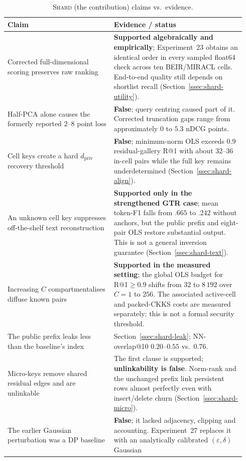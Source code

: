 \documentclass[11pt,a4paper]{article}
\begin{document}
\begin{table}[tbp]
\centering
\caption{\textsc{Shard} (the contribution) claims vs.\ evidence.}
\label{tab:shard-claims}
\footnotesize
\begin{tabular}{@{}p{0.42\linewidth}p{0.52\linewidth}@{}}
\toprule
\textbf{Claim} & \textbf{Evidence / status} \\ \midrule
Corrected full-dimensional scoring preserves raw ranking &
\textbf{Supported algebraically and empirically}; Experiment~23 obtains an
identical order in every sampled float64 check across ten BEIR/MIRACL cells.
End-to-end quality still depends on shortlist recall
(Section~\ref{ssec:shard-utility}). \\
Half-PCA alone causes the formerly reported $2$--$8$ point loss &
\textbf{False}; query centring caused part of it. Corrected truncation gaps
range from approximately $0$ to $5.3$ nDCG points. \\
Cell keys create a hard $d_{\mathrm{priv}}$ recovery threshold &
\textbf{False}; minimum-norm OLS exceeds $0.9$ residual-gallery R@1 with
about $32$--$36$ in-cell pairs while the full key remains underdetermined
(Section~\ref{ssec:shard-align}). \\
An unknown cell key suppresses off-the-shelf text reconstruction &
\textbf{Supported only in the strengthened GTR case}; mean token-F1 falls
from $.665$ to $.242$ without anchors, but the public prefix and eight-pair OLS
restore substantial output. This is not a general inversion guarantee
(Section~\ref{ssec:shard-text}). \\
Increasing $C$ compartmentalises diffuse known pairs &
\textbf{Supported in the measured setting}; the global OLS budget for
R@1$\ge0.9$ shifts from $32$ to $8\,192$ over $C=1$ to $256$. The associated
active-cell and packed-CKKS costs are measured separately; this is not a
formal security threshold. \\
The public prefix leaks less than the baseline's index &
Section~\ref{ssec:shard-leak}; NN-overlap@10 $0.20$--$0.55$ vs.\ $0.76$. \\
Micro-keys remove shared residual edges and are unlinkable &
The first clause is supported; \textbf{unlinkability is false}. Norm-rank and
the unchanged prefix link persistent rows almost perfectly even with
insert/delete churn (Section~\ref{ssec:shard-micro}). \\
The earlier Gaussian perturbation was a DP baseline &
\textbf{False}; it lacked adjacency, clipping and accounting. Experiment~27
replaces it with an analytically calibrated $(\varepsilon,\delta)$ Gaussian

\end{tabular}
\end{table}
\end{document}

